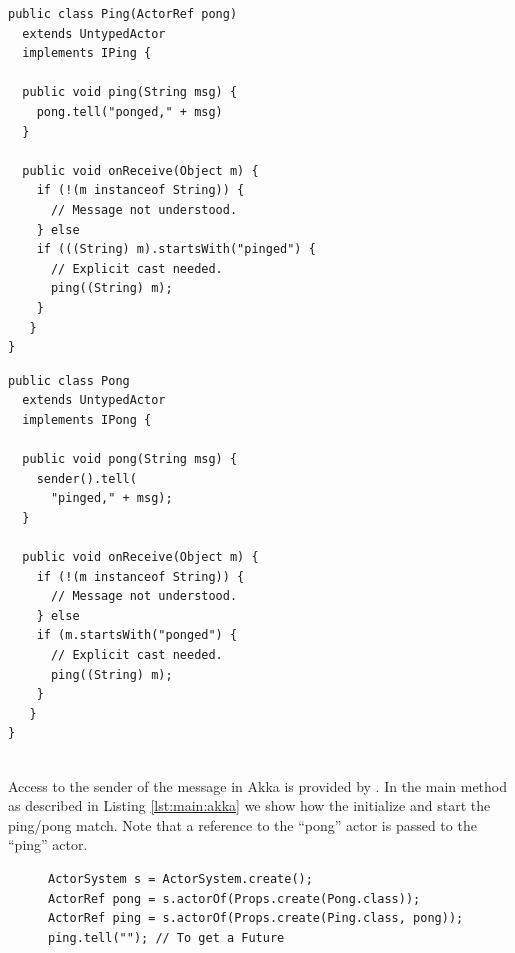 \lstset{language=Java}
\begin{center}
\begin{minipage}[t]{0.48\textwidth}
\begin{lstlisting}[caption=Ping actor in Akka,label=lst:ping:akka]
public class Ping(ActorRef pong)
  extends UntypedActor 
  implements IPing {

  public void ping(String msg) {
    pong.tell("ponged," + msg)
  }

  public void onReceive(Object m) {
    if (!(m instanceof String)) {
      // Message not understood.
    } else 
    if (((String) m).startsWith("pinged") {
      // Explicit cast needed.
      ping((String) m);
    } 
   }
}
\end{lstlisting}
\end{minipage}
\hfill
\begin{minipage}[t]{0.48\textwidth}
\begin{lstlisting}[caption=Pong class in Akka,label=lst:pong:akka]
public class Pong 
  extends UntypedActor 
  implements IPong {

  public void pong(String msg) {
    sender().tell(
      "pinged," + msg); 
  }

  public void onReceive(Object m) {
    if (!(m instanceof String)) {
      // Message not understood.
    } else 
    if (m.startsWith("ponged") {
      // Explicit cast needed.
      ping((String) m);
    } 
   }
}
 
\end{lstlisting}
\end{minipage}
\end{center}

Access to the sender of the message in Akka is provided by .
In the main method as described in Listing \ref{lst:main:akka} we show how the initialize and start the ping/pong match.
Note that a reference to the ``pong'' actor is passed to the ``ping'' actor.

\begin{figure}
\vspace{-20pt}
\begin{lstlisting}[caption=main in Akka,label=lst:main:akka]
ActorSystem s = ActorSystem.create();
ActorRef pong = s.actorOf(Props.create(Pong.class));
ActorRef ping = s.actorOf(Props.create(Ping.class, pong));
ping.tell(""); // To get a Future
\end{lstlisting}
\vspace{-20pt}
\end{figure}

